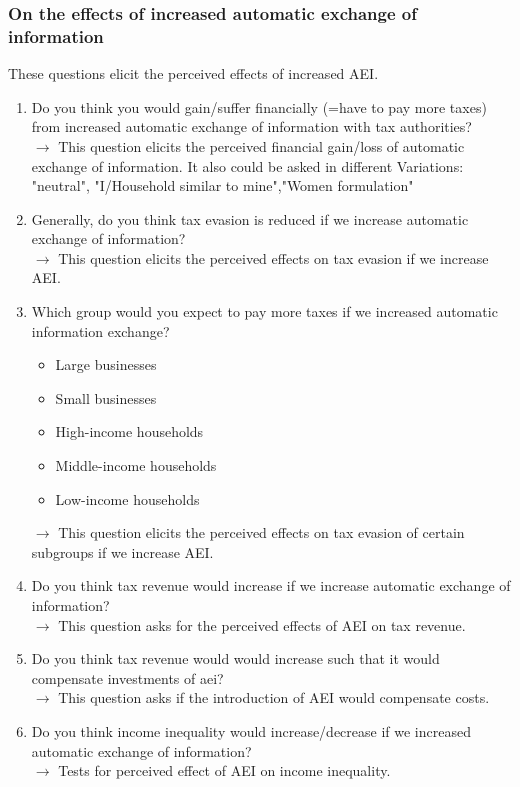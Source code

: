 \documentclass[12pt]{article}
\begin{document}
\subsubsection{On the effects of increased automatic exchange of information}
These questions elicit the perceived effects of increased AEI. 
\begin{enumerate}
    \item Do you think you would gain/suffer financially (=have to pay more taxes) from increased automatic exchange of information with tax authorities? \\ $\rightarrow$ This question elicits the perceived financial gain/loss of automatic exchange of information. It also could be asked in different Variations: "neutral", "I/Household similar to mine","Women formulation" 
    \item Generally, do you think tax evasion is reduced if we increase automatic exchange of information? \\ $\rightarrow$ This question elicits the perceived effects on tax evasion if we increase AEI. 
    \item Which group would you expect to pay more taxes if we increased automatic information exchange?
    \begin{itemize}
        \item Large businesses
        \item Small businesses
        \item High-income households
        \item Middle-income households
        \item Low-income households
    \end{itemize} $\rightarrow$ This question elicits the perceived effects on tax evasion of certain subgroups if we increase AEI.
    \item Do you think tax revenue would increase if we increase automatic exchange of information? \\ $\rightarrow$ This question asks for the perceived effects of AEI on tax revenue.
    \item Do you think tax revenue would would increase such that it would compensate investments of aei? \\ $\rightarrow$ This question asks if the introduction of AEI would compensate costs. 
    \item Do you think income inequality would increase/decrease if we increased automatic exchange of information? \\ $\rightarrow$ Tests for perceived effect of AEI on income inequality. 

\end{enumerate}
\end{document}
